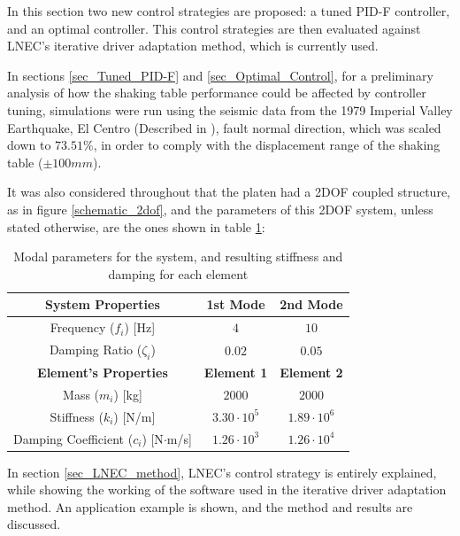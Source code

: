 \documentclass[  10pt, twoside]{report} %
\numberwithin{equation}{chapter}
\begin{document}
In this section two new control strategies are proposed: a tuned PID-F controller, and an optimal controller. This control strategies are then evaluated against LNEC's iterative driver adaptation method, which is currently used.

In sections \ref{sec_Tuned_PID-F} and \ref{sec_Optimal_Control}, for a preliminary analysis of how the shaking table performance could be affected by controller tuning, simulations were run using the seismic data from the 1979  Imperial Valley Earthquake, El Centro (Described in \cite{narasimhan2006}), fault normal direction, which was scaled down to $73.51\%$, in order to comply with the displacement range of the shaking table ($\pm 100mm$).

It was also considered throughout that the platen had a 2DOF coupled structure, as in figure \ref{schematic_2dof}, and the parameters of this 2DOF system, unless stated otherwise, are the ones shown in table \ref{tab:modal_params}:

\begin{table}[H]
    \centering
    \caption{Modal parameters for the system, and resulting stiffness and damping for each element}
    \renewcommand{\arraystretch}{1.3}
    \begin{tabular}{ c c c }
        \hline
        \textbf{System Properties} & \textbf{1st Mode} & \textbf{2nd Mode} \\
        \hline
        Frequency ($f_i$) [Hz] & $4$ & $10$ \\
        Damping Ratio ($\zeta_i$) & $0.02$ & $0.05$ \\
        \hline
        \textbf{Element's Properties} & \textbf{Element 1} & \textbf{Element 2} \\
        \hline
        Mass ($m_i$) [kg] & $2000$ & $2000$ \\
        Stiffness ($k_i$) [N/m] & $3.30\cdot 10^5$ & $1.89\cdot 10^6$ \\
        Damping Coefficient ($c_i$) [N$\cdot$m/s] & $1.26\cdot 10^3$ & $1.26\cdot 10^4$ \\
        \hline
    \end{tabular}
    \label{tab:modal_params}
\end{table}

In section \ref{sec_LNEC_method}, LNEC's control strategy is entirely explained, while showing the working of the software used in the iterative driver adaptation method. An application example is shown, and the method and results are discussed.
\end{document}
